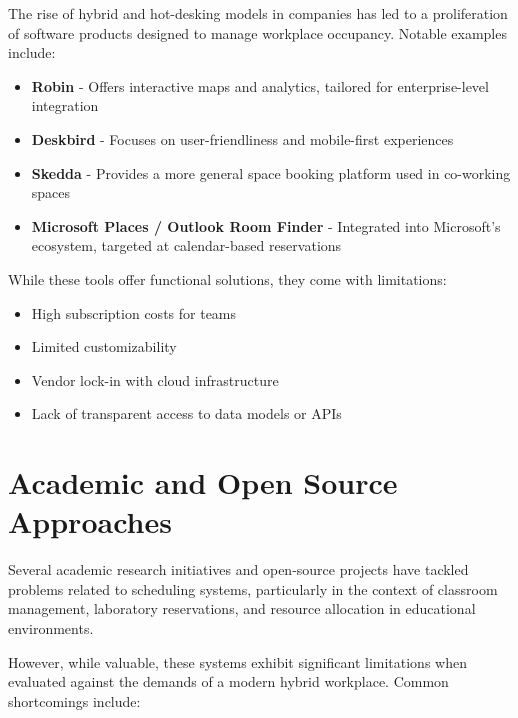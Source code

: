 \documentclass[12pt,a4paper]{report} %
\begin{document}
The rise of hybrid and hot-desking models in companies has led to a proliferation of software products designed to manage workplace occupancy. Notable examples include:
\begin{itemize}
    \item \textbf{Robin} - Offers interactive maps and analytics, tailored for enterprise-level integration
    \item \textbf{Deskbird} - Focuses on user-friendliness and mobile-first experiences
    \item \textbf{Skedda} - Provides a more general space booking platform used in co-working spaces
    \item \textbf{Microsoft Places / Outlook Room Finder} - Integrated into Microsoft's ecosystem, targeted at calendar-based reservations
\end{itemize}

While these tools offer functional solutions, they come with limitations:
\begin{itemize}
    \item High subscription costs for teams
    \item Limited customizability
    \item Vendor lock-in with cloud infrastructure
    \item Lack of transparent access to data models or APIs
\end{itemize}

\section{Academic and Open Source Approaches}

Several academic research initiatives and open-source projects have tackled problems related to scheduling systems, particularly in the context of classroom management, laboratory reservations, and resource allocation in educational environments.


However, while valuable, these systems exhibit significant limitations when evaluated against the demands of a modern hybrid workplace. Common shortcomings include:
\end{document}

